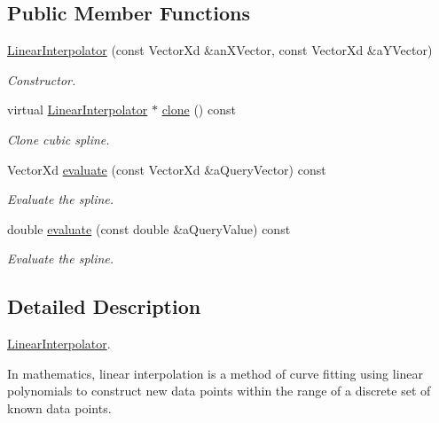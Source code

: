 \subsection*{Public Member Functions}
\begin{DoxyCompactItemize}
\item 
\hyperlink{classostk_1_1math_1_1curvefitting_1_1interp_1_1_linear_interpolator_a83d1fd327b0d591cc1d1a5c48ca3d12d}{Linear\+Interpolator} (const Vector\+Xd \&an\+X\+Vector, const Vector\+Xd \&a\+Y\+Vector)
\begin{DoxyCompactList}\small\item\em Constructor. \end{DoxyCompactList}\item 
virtual \hyperlink{classostk_1_1math_1_1curvefitting_1_1interp_1_1_linear_interpolator}{Linear\+Interpolator} $\ast$ \hyperlink{classostk_1_1math_1_1curvefitting_1_1interp_1_1_linear_interpolator_aaf48bb953f88279ff2cb755da611e937}{clone} () const
\begin{DoxyCompactList}\small\item\em Clone cubic spline. \end{DoxyCompactList}\item 
Vector\+Xd \hyperlink{classostk_1_1math_1_1curvefitting_1_1interp_1_1_linear_interpolator_abf0d1f4f1bf3dc1a64cfb1183c8e3e83}{evaluate} (const Vector\+Xd \&a\+Query\+Vector) const
\begin{DoxyCompactList}\small\item\em Evaluate the spline. \end{DoxyCompactList}\item 
double \hyperlink{classostk_1_1math_1_1curvefitting_1_1interp_1_1_linear_interpolator_ade4cbbc6da45e0dedd71d86a45258512}{evaluate} (const double \&a\+Query\+Value) const
\begin{DoxyCompactList}\small\item\em Evaluate the spline. \end{DoxyCompactList}\end{DoxyCompactItemize}


\subsection{Detailed Description}
\hyperlink{classostk_1_1math_1_1curvefitting_1_1interp_1_1_linear_interpolator}{Linear\+Interpolator}. 

In mathematics, linear interpolation is a method of curve fitting using linear polynomials to construct new data points within the range of a discrete set of known data points.

